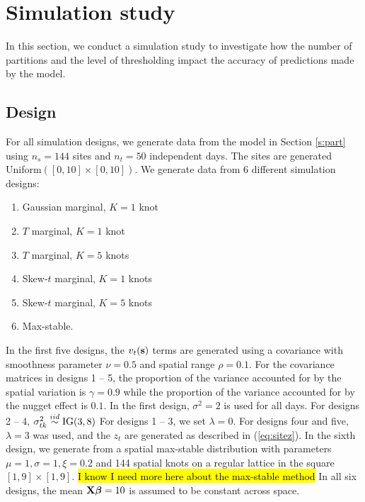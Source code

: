 \documentclass[11pt]{article}
\begin{document}
\section{Simulation study}\label{s:simstudy}
In this section, we conduct a simulation study to investigate how the number of partitions and the level of thresholding impact the accuracy of predictions made by the model.

\subsection{Design}\label{s:simdesign}
For all simulation designs, we generate data from the model in Section \ref{s:part} using $n_s=144$ sites and $n_t=50$ independent days.
The sites are generated Uniform$([0, 10] \times [0, 10])$.
We generate data from 6 different simulation designs:
\begin{enumerate} \setlength{\itemsep}{-0.5em}
  \item Gaussian marginal, $K=1$ knot
  \item $T$ marginal, $K=1$ knot
  \item $T$ marginal, $K=5$ knots
  \item Skew-$t$ marginal, $K=1$ knots
  \item Skew-$t$ marginal, $K=5$ knots
  \item Max-stable.
\end{enumerate}
In the first five designs, the $v_t(\mbox{\bf s})$ terms are generated using a \Matern covariance with smoothness parameter $\nu = 0.5$ and spatial range $\rho = 0.1$.
For the covariance matrices in designs 1 -- 5, the proportion of the variance accounted for by the spatial variation is $\gamma = 0.9$ while the proportion of the variance accounted for by the nugget effect is $0.1$.
In the first design, $\sigma^2 = 2$ is used for all days.
For designs 2 -- 4, $\sigma^2_{tk} \stackrel{iid}{\sim} \text{IG}(3, 8)$
For designs 1 -- 3, we set $\lambda = 0$.
For designs four and five, $\lambda = 3$ was used, and the $z_t$ are generated as described in (\ref{eq:sitez}).
In the sixth design, we generate from a spatial max-stable distribution \citep{Reich2012} with parameters $\mu = 1, \sigma=1, \xi=0.2$ and 144 spatial knots on a regular lattice in the square $[1, 9] \times [1, 9]$.
\hl{I know I need more here about the max-stable method}
In all six designs, the mean $\mbox{\bf X} \mbox{\boldmath $\beta$} = 10$ is assumed to be constant across space.
\end{document}
